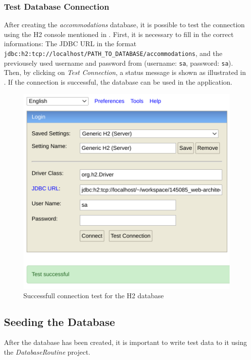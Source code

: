 \subsubsection{Test Database Connection}\label{sec:03_depl_h2_test}
After creating the \textit{accommodations} database, it is possible to test the connection using the H2 console mentioned in .
First, it is necessary to fill in the correct informations: The JDBC URL in the format \texttt{jdbc:h2:tcp://localhost/PATH\_TO\_DATABASE/accommodations}, and the previousely used username and password from  (username: \texttt{sa}, password: \texttt{sa}).
Then, by clicking on \textit{Test Connection}, a status message is shown as illustrated in . If the connection is successful, the database can be used in the application.
\begin{figure}[h]
\centering
\includegraphics[scale=0.3]{images/03_depl/h2_test}
\caption{Successfull connection test for the H2 database}
\label{fig:03_depl_createdb_h2test}
\end{figure}

\newpage
\subsection{Seeding the Database}\label{sec:03_depl_seeddb}
After the database has been created, it is important to write test data to it using the \textit{DatabaseRoutine} project.

